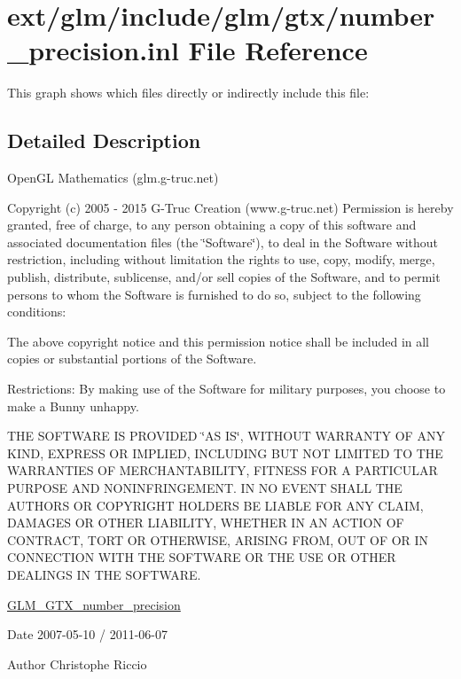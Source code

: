\hypertarget{number__precision_8inl}{\section{ext/glm/include/glm/gtx/number\-\_\-precision.inl File Reference}
\label{number__precision_8inl}
}
This graph shows which files directly or indirectly include this file\-:


\subsection{Detailed Description}
Open\-G\-L Mathematics (glm.\-g-\/truc.\-net)

Copyright (c) 2005 -\/ 2015 G-\/\-Truc Creation (www.\-g-\/truc.\-net) Permission is hereby granted, free of charge, to any person obtaining a copy of this software and associated documentation files (the \char`\"{}\-Software\char`\"{}), to deal in the Software without restriction, including without limitation the rights to use, copy, modify, merge, publish, distribute, sublicense, and/or sell copies of the Software, and to permit persons to whom the Software is furnished to do so, subject to the following conditions\-:

The above copyright notice and this permission notice shall be included in all copies or substantial portions of the Software.

Restrictions\-: By making use of the Software for military purposes, you choose to make a Bunny unhappy.

T\-H\-E S\-O\-F\-T\-W\-A\-R\-E I\-S P\-R\-O\-V\-I\-D\-E\-D \char`\"{}\-A\-S I\-S\char`\"{}, W\-I\-T\-H\-O\-U\-T W\-A\-R\-R\-A\-N\-T\-Y O\-F A\-N\-Y K\-I\-N\-D, E\-X\-P\-R\-E\-S\-S O\-R I\-M\-P\-L\-I\-E\-D, I\-N\-C\-L\-U\-D\-I\-N\-G B\-U\-T N\-O\-T L\-I\-M\-I\-T\-E\-D T\-O T\-H\-E W\-A\-R\-R\-A\-N\-T\-I\-E\-S O\-F M\-E\-R\-C\-H\-A\-N\-T\-A\-B\-I\-L\-I\-T\-Y, F\-I\-T\-N\-E\-S\-S F\-O\-R A P\-A\-R\-T\-I\-C\-U\-L\-A\-R P\-U\-R\-P\-O\-S\-E A\-N\-D N\-O\-N\-I\-N\-F\-R\-I\-N\-G\-E\-M\-E\-N\-T. I\-N N\-O E\-V\-E\-N\-T S\-H\-A\-L\-L T\-H\-E A\-U\-T\-H\-O\-R\-S O\-R C\-O\-P\-Y\-R\-I\-G\-H\-T H\-O\-L\-D\-E\-R\-S B\-E L\-I\-A\-B\-L\-E F\-O\-R A\-N\-Y C\-L\-A\-I\-M, D\-A\-M\-A\-G\-E\-S O\-R O\-T\-H\-E\-R L\-I\-A\-B\-I\-L\-I\-T\-Y, W\-H\-E\-T\-H\-E\-R I\-N A\-N A\-C\-T\-I\-O\-N O\-F C\-O\-N\-T\-R\-A\-C\-T, T\-O\-R\-T O\-R O\-T\-H\-E\-R\-W\-I\-S\-E, A\-R\-I\-S\-I\-N\-G F\-R\-O\-M, O\-U\-T O\-F O\-R I\-N C\-O\-N\-N\-E\-C\-T\-I\-O\-N W\-I\-T\-H T\-H\-E S\-O\-F\-T\-W\-A\-R\-E O\-R T\-H\-E U\-S\-E O\-R O\-T\-H\-E\-R D\-E\-A\-L\-I\-N\-G\-S I\-N T\-H\-E S\-O\-F\-T\-W\-A\-R\-E.

\hyperlink{group__gtx__number__precision}{G\-L\-M\-\_\-\-G\-T\-X\-\_\-number\-\_\-precision}

\begin{DoxyDate}{Date}
2007-\/05-\/10 / 2011-\/06-\/07 
\end{DoxyDate}
\begin{DoxyAuthor}{Author}
Christophe Riccio 
\end{DoxyAuthor}
